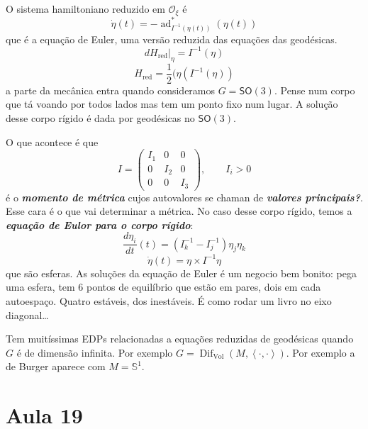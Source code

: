 O sistema hamiltoniano reduzido em $\mathcal{O}_\xi$ é
\[\dot \eta(t)=-\operatorname{ad}^*_{I^{-1}(\eta(t))}(\eta(t))\]
que é a equação de Euler, uma versão reduzida das equações das geodésicas.
\[dH_{\operatorname{red}}|_{\eta}=I^{-1}(\eta)\]
\[H_{\operatorname{red}}=\frac{1}{2}(\eta(I^{-1}(\eta))\]
a parte da mecânica entra quando consideramos $G=\mathsf{SO}(3)$. Pense num corpo que tá voando por todos lados mas tem um ponto fixo num lugar. A solução desse corpo rígido é dada por geodésicas no $\mathsf{SO}(3)$.

O que acontece é que
\[I=\begin{pmatrix} I_1&0&0\\0&I_2&0\\0&0&I_3 \end{pmatrix} ,\qquad I_i>0\]
é o \textit{\textbf{momento de métrica}} cujos autovalores se chaman de \textit{\textbf{valores principais?}}. Esse cara  é o que vai determinar a métrica. No caso desse corpo rígido, temos a \textit{\textbf{equação de Eulor para o corpo rígido}}:
\[\frac{d\eta_i}{dt}(t)=(I_k^{-1}-I_j^{-1})\eta_j\eta_k\]
\[\dot \eta(t)=\eta\times I^{-1}\eta\]
que são esferas. As soluções da equação de Euler é um negocio bem bonito: pega uma esfera, tem 6 pontos de equilíbrio que estão em pares, dois em cada autoespaço. Quatro estáveis, dos inestáveis. {\color{4}É como rodar um livro no eixo diagonal…}

\begin{remark}\leavevmode
	Tem muitíssimas EDPs relacionadas a equações  reduzidas de geodésicas quando $G$ é de dimensão infinita. Por exemplo $G=\operatorname{Dif}_{\operatorname{Vol}}(M,\left<\cdot,\cdot\right> )$. Por exemplo a de Burger aparece com $M=\mathbb{S}^1$.
\end{remark}









\section{Aula 19}




